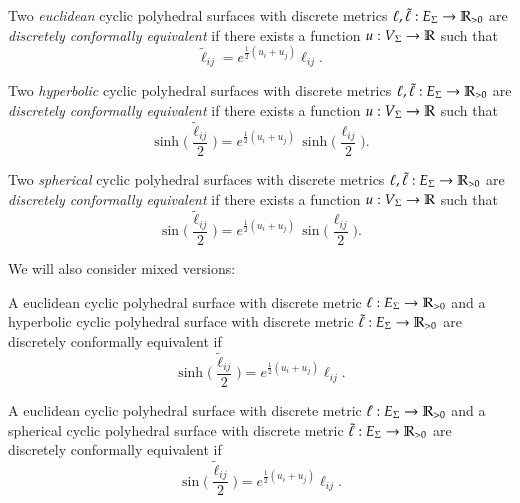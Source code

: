 \documentclass[Thesis]{subfiles}
\begin{document}
\begin{definition}
  \label{def:dconf}
  \begin{compactitem}
  \item Two \emph{euclidean} cyclic polyhedral surfaces with discrete
  metrics $\ell,\tilde\ell:E_{\Sigma}\rightarrow\mathbb R_{>0}$ are
    \emph{discretely conformally equivalent} if there exists a
    function $u:V_{\Sigma}\rightarrow\mathbb R$ such that
  \begin{equation}
    \label{eq:tilde_ell_euc}
    \tilde\ell_\mathit{ij}=e^{\frac{1}{2}(u_{i}+u_{j})}\ell_\mathit{ij}.
  \end{equation}
  \item Two \emph{hyperbolic} cyclic polyhedral surfaces with discrete
  metrics $\ell,\tilde\ell:E_{\Sigma}\rightarrow\mathbb R_{>0}$ are
    \emph{discretely conformally equivalent} if there exists a
    function $u:V_{\Sigma}\rightarrow\mathbb R$ such that
  \begin{equation}
    \label{eq:tilde_ell_hyp}
    \sinh\Big(\frac{\tilde\ell_\mathit{ij}}{2}\Big)
    = e^{\frac{1}{2}(u_{i}+u_{j})}\,
    \sinh\Big(\frac{\ell_\mathit{ij}}{2}\Big).
  \end{equation}
  \item Two \emph{spherical} cyclic polyhedral surfaces with discrete
  metrics $\ell,\tilde\ell:E_{\Sigma}\rightarrow\mathbb R_{>0}$ are
    \emph{discretely conformally equivalent} if there exists a
    function $u:V_{\Sigma}\rightarrow\mathbb R$ such that
  \begin{equation}
    \label{eq:tilde_ell_sph}
    \sin\Big(\frac{\tilde\ell_\mathit{ij}}{2}\Big)
    = e^{\frac{1}{2}(u_{i}+u_{j})}\,
    \sin\Big(\frac{\ell_\mathit{ij}}{2}\Big).
  \end{equation}
  \end{compactitem}
We will also consider mixed versions: 
\begin{compactitem}
\item 
  A euclidean cyclic polyhedral surface with discrete
  metric $\ell:E_{\Sigma}\rightarrow\mathbb R_{>0}$ and a hyperbolic cyclic
  polyhedral surface with discrete metric
  $\tilde\ell:E_{\Sigma}\rightarrow\mathbb R_{>0}$ are discretely conformally
  equivalent if
  \begin{equation*}
    \sinh\Big(\frac{\tilde\ell_\mathit{ij}}{2}\Big)
    = e^{\frac{1}{2}(u_{i}+u_{j})}\ell_\mathit{ij}.
  \end{equation*}
\item 
  A euclidean cyclic polyhedral surface with discrete
  metric $\ell:E_{\Sigma}\rightarrow\mathbb R_{>0}$ and a spherical cyclic
  polyhedral surface with discrete metric
  $\tilde\ell:E_{\Sigma}\rightarrow\mathbb R_{>0}$ are discretely conformally
  equivalent if
  \begin{equation*}
    \sin\Big(\frac{\tilde\ell_\mathit{ij}}{2}\Big)
    = e^{\frac{1}{2}(u_{i}+u_{j})}\ell_\mathit{ij}.
  \end{equation*}
\end{compactitem}
\end{definition}
\end{document}
